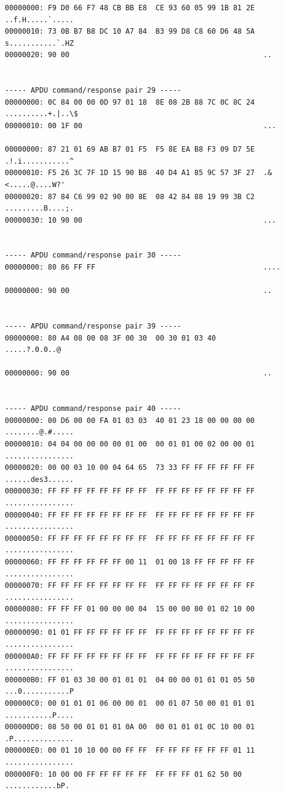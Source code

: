 \documentclass[bsc,frontabs,twoside,singlespacing,parskip,deptreport]{infthesis}     %
\begin{document}
\begin{appendices}
\begin{Verbatim}[commandchars=\\\{\}, fontsize=\small]
00000000: F9 D0 66 F7 48 CB BB E8  CE 93 60 05 99 1B 81 2E  ..f.H.....`.....
00000010: 73 0B B7 B8 DC 10 A7 84  B3 99 D8 C8 60 D6 48 5A  s...........`.HZ
00000020: 90 00                                             ..


----- APDU command/response pair 29 -----
00000000: 0C 84 00 00 0D 97 01 18  8E 08 2B 88 7C 0C 8C 24  ..........+.|..\$
00000010: 00 1F 00                                          ...

00000000: 87 21 01 69 AB B7 01 F5  F5 8E EA B8 F3 09 D7 5E  .!.i...........^
00000010: F5 26 3C 7F 1D 15 90 B8  40 D4 A1 85 9C 57 3F 27  .&<.....@....W?'
00000020: 87 84 C6 99 02 90 00 8E  08 42 84 88 19 99 3B C2  .........B....;.
00000030: 10 90 00                                          ...


----- APDU command/response pair 30 -----
00000000: 80 86 FF FF                                       ....

00000000: 90 00                                             ..


----- APDU command/response pair 39 -----
00000000: 80 A4 08 00 08 3F 00 30  00 30 01 03 40           .....?.0.0..@

00000000: 90 00                                             ..


----- APDU command/response pair 40 -----
00000000: 00 D6 00 00 FA 01 03 03  40 01 23 18 00 00 00 00  ........@.#.....
00000010: 04 04 00 00 00 00 01 00  00 01 01 00 02 00 00 01  ................
00000020: 00 00 03 10 00 04 64 65  73 33 FF FF FF FF FF FF  ......des3......
00000030: FF FF FF FF FF FF FF FF  FF FF FF FF FF FF FF FF  ................
00000040: FF FF FF FF FF FF FF FF  FF FF FF FF FF FF FF FF  ................
00000050: FF FF FF FF FF FF FF FF  FF FF FF FF FF FF FF FF  ................
00000060: FF FF FF FF FF FF 00 11  01 00 18 FF FF FF FF FF  ................
00000070: FF FF FF FF FF FF FF FF  FF FF FF FF FF FF FF FF  ................
00000080: FF FF FF 01 00 00 00 04  15 00 00 00 01 02 10 00  ................
00000090: 01 01 FF FF FF FF FF FF  FF FF FF FF FF FF FF FF  ................
000000A0: FF FF FF FF FF FF FF FF  FF FF FF FF FF FF FF FF  ................
000000B0: FF 01 03 30 00 01 01 01  04 00 00 01 01 01 05 50  ...0...........P
000000C0: 00 01 01 01 06 00 00 01  00 01 07 50 00 01 01 01  ...........P....
000000D0: 08 50 00 01 01 01 0A 00  00 01 01 01 0C 10 00 01  .P..............
000000E0: 00 01 10 10 00 00 FF FF  FF FF FF FF FF FF 01 11  ................
000000F0: 10 00 00 FF FF FF FF FF  FF FF FF 01 62 50 00     ............bP.


\end{Verbatim}
\end{appendices}
\end{document}
